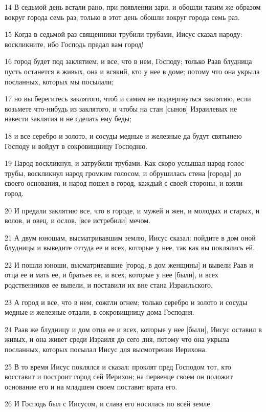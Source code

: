 \par 14 В седьмой день встали рано, при появлении зари, и обошли таким же образом вокруг города семь раз; только в этот день обошли вокруг города семь раз.
\par 15 Когда в седьмой раз священники трубили трубами, Иисус сказал народу: воскликните, ибо Господь предал вам город!
\par 16 город будет под заклятием, и все, что в нем, Господу; только Раав блудница пусть останется в живых, она и всякий, кто у нее в доме; потому что она укрыла посланных, которых мы посылали;
\par 17 но вы берегитесь заклятого, чтоб и самим не подвергнуться заклятию, если возьмете что-нибудь из заклятого, и чтобы на стан [сынов] Израилевых не навести заклятия и не сделать ему беды;
\par 18 и все серебро и золото, и сосуды медные и железные да будут святынею Господу и войдут в сокровищницу Господню.
\par 19 Народ воскликнул, и затрубили трубами. Как скоро услышал народ голос трубы, воскликнул народ громким голосом, и обрушилась стена [города] до своего основания, и народ пошел в город, каждый с своей стороны, и взяли город.
\par 20 И предали заклятию все, что в городе, и мужей и жен, и молодых и старых, и волов, и овец, и ослов, [все истребили] мечом.
\par 21 А двум юношам, высматривавшим землю, Иисус сказал: пойдите в дом оной блудницы и выведите оттуда ее и всех, которые у нее, так как вы поклялись ей.
\par 22 И пошли юноши, высматривавшие [город, в дом женщины] и вывели Раав и отца ее и мать ее, и братьев ее, и всех, которые у нее [были], и всех родственников ее вывели, и поставили их вне стана Израильского.
\par 23 А город и все, что в нем, сожгли огнем; только серебро и золото и сосуды медные и железные отдали, в сокровищницу дома Господня.
\par 24 Раав же блудницу и дом отца ее и всех, которые у нее [были], Иисус оставил в живых, и она живет среди Израиля до сего дня, потому что она укрыла посланных, которых посылал Иисус для высмотрения Иерихона.
\par 25 В то время Иисус поклялся и сказал: проклят пред Господом тот, кто восставит и построит город сей Иерихон; на первенце своем он положит основание его и на младшем своем поставит врата его.
\par 26 И Господь был с Иисусом, и слава его носилась по всей земле.

